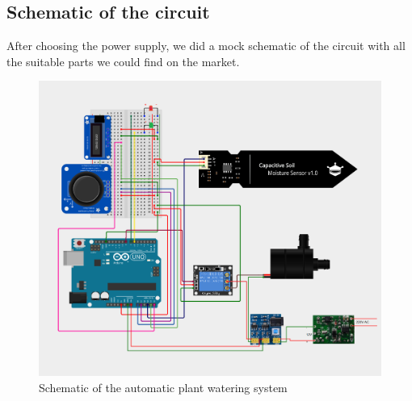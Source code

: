 \documentclass[12pt]{article}
\begin{document}
    \subsection{Schematic of the circuit}
    After choosing the power supply, we did a mock schematic of the circuit with all the suitable parts we could find on the market.
    \begin{figure}[H]
        \centering
        \includegraphics[width=14cm]{./images/breadboard.png}
        \caption{Schematic of the automatic plant watering system}
        \label{fig:schematic}
    \end{figure}
\end{document}

